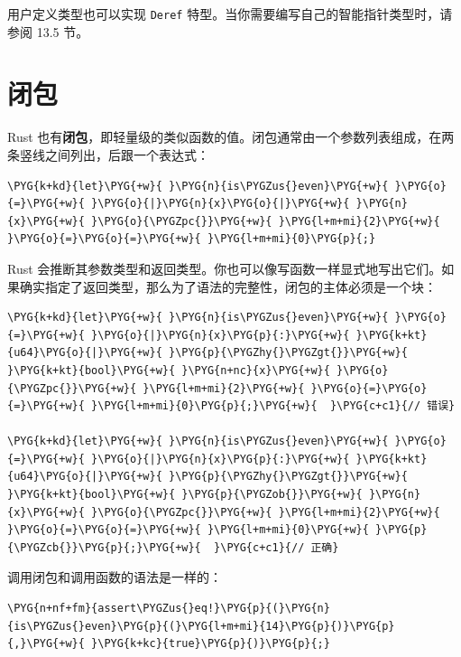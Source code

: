 用户定义类型也可以实现 \texttt{Deref} 特型。当你需要编写自己的智能指针类型时，请参阅 13.5 节。

\section{闭包}

Rust 也有\textbf{闭包}，即轻量级的类似函数的值。闭包通常由一个参数列表组成，在两条竖线之间列出，后跟一个表达式：

\begin{Verbatim}[commandchars=\\\{\},breaklines=true,breakanywhere=true,fontsize=\codefont,xleftmargin=17bp]
\PYG{k+kd}{let}\PYG{+w}{ }\PYG{n}{is\PYGZus{}even}\PYG{+w}{ }\PYG{o}{=}\PYG{+w}{ }\PYG{o}{|}\PYG{n}{x}\PYG{o}{|}\PYG{+w}{ }\PYG{n}{x}\PYG{+w}{ }\PYG{o}{\PYGZpc{}}\PYG{+w}{ }\PYG{l+m+mi}{2}\PYG{+w}{ }\PYG{o}{=}\PYG{o}{=}\PYG{+w}{ }\PYG{l+m+mi}{0}\PYG{p}{;}
\end{Verbatim}

Rust 会推断其参数类型和返回类型。你也可以像写函数一样显式地写出它们。如果确实指定了返回类型，那么为了语法的完整性，闭包的主体必须是一个块：

\begin{Verbatim}[commandchars=\\\{\},breaklines=true,breakanywhere=true,fontsize=\codefont,xleftmargin=17bp]
\PYG{k+kd}{let}\PYG{+w}{ }\PYG{n}{is\PYGZus{}even}\PYG{+w}{ }\PYG{o}{=}\PYG{+w}{ }\PYG{o}{|}\PYG{n}{x}\PYG{p}{:}\PYG{+w}{ }\PYG{k+kt}{u64}\PYG{o}{|}\PYG{+w}{ }\PYG{p}{\PYGZhy{}\PYGZgt{}}\PYG{+w}{ }\PYG{k+kt}{bool}\PYG{+w}{ }\PYG{n+nc}{x}\PYG{+w}{ }\PYG{o}{\PYGZpc{}}\PYG{+w}{ }\PYG{l+m+mi}{2}\PYG{+w}{ }\PYG{o}{=}\PYG{o}{=}\PYG{+w}{ }\PYG{l+m+mi}{0}\PYG{p}{;}\PYG{+w}{  }\PYG{c+c1}{// 错误}

\PYG{k+kd}{let}\PYG{+w}{ }\PYG{n}{is\PYGZus{}even}\PYG{+w}{ }\PYG{o}{=}\PYG{+w}{ }\PYG{o}{|}\PYG{n}{x}\PYG{p}{:}\PYG{+w}{ }\PYG{k+kt}{u64}\PYG{o}{|}\PYG{+w}{ }\PYG{p}{\PYGZhy{}\PYGZgt{}}\PYG{+w}{ }\PYG{k+kt}{bool}\PYG{+w}{ }\PYG{p}{\PYGZob{}}\PYG{+w}{ }\PYG{n}{x}\PYG{+w}{ }\PYG{o}{\PYGZpc{}}\PYG{+w}{ }\PYG{l+m+mi}{2}\PYG{+w}{ }\PYG{o}{=}\PYG{o}{=}\PYG{+w}{ }\PYG{l+m+mi}{0}\PYG{+w}{ }\PYG{p}{\PYGZcb{}}\PYG{p}{;}\PYG{+w}{  }\PYG{c+c1}{// 正确}
\end{Verbatim}

调用闭包和调用函数的语法是一样的：

\begin{Verbatim}[commandchars=\\\{\},breaklines=true,breakanywhere=true,fontsize=\codefont,xleftmargin=17bp]
\PYG{n+nf+fm}{assert\PYGZus{}eq!}\PYG{p}{(}\PYG{n}{is\PYGZus{}even}\PYG{p}{(}\PYG{l+m+mi}{14}\PYG{p}{)}\PYG{p}{,}\PYG{+w}{ }\PYG{k+kc}{true}\PYG{p}{)}\PYG{p}{;}
\end{Verbatim}

